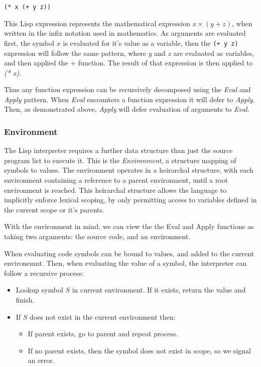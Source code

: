 \documentclass[10pt]{report}
\begin{document}
\texttt{(* x (+ y z))}

This Lisp expression represents the mathematical expression $x \times (y + z)$, when written in the infix notation used in mathematics. As arguments are evaluated first, the symbol $x$ is evaluated for it's value as a variable, then the \texttt{(+ y z)} expression will follow the same pattern, where $y$ and $z$ are evaluated as variables, and then applied the $+$ function. The result of that expression is then applied to \textit{(* x)}.

Thus any function expression can be recursively decomposed using the \textit{Eval} and \textit{Apply} pattern. When \textit{Eval} encounters a function expression it will defer to \textit{Apply}. Then, as demonstrated above, \textit{Apply} will defer evaluation of arguments to \textit{Eval}.

\subsubsection{Environment}
The Lisp interpreter requires a further data structure than just the source program list to execute it. This is the \textit{Environment}, a structure mapping of symbols to values. The environment operates in a heirarchal structure, with each environment containing a reference to a parent environment, until a root environment is reached. This heirarchal structure allows the language to implicitly enforce lexical scoping, by only permitting access to variables defined in the current scope or it's parents.

With the environment in mind, we can view the the Eval and Apply functions as taking two arguments: the source code, and an environment.

When evaluating code symbols can be bound to values, and added to the current environemnt. Then, when evaluating the value of a symbol, the interpreter can follow a recursive process:

\begin{itemize}
\item Lookup symbol $S$ in current environment. If it exists, return the value and finish.
\item If $S$ does not exist in the current environment then:
  \begin{itemize}
  \item If parent exists, go to parent and repeat process.
  \item If no parent exists, then the symbol does not exist in scope, so we signal an error.
  \end{itemize}
\end{itemize}
\end{document}
